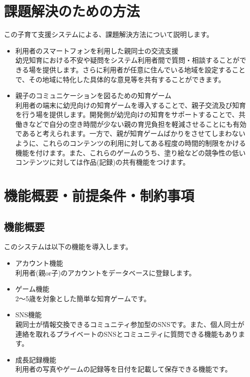\documentclass[a4j]{jarticle}
\begin{document}
\section{課題解決のための方法}
この子育て支援システムによる、課題解決方法について説明します。
\begin{itemize}
  \item 利用者のスマートフォンを利用した親同士の交流支援 ~\\
    幼児知育における不安や疑問をシステム利用者間で質問・相談することができる場を提供します。さらに利用者が任意に住んでいる地域を設定することで、その地域に特化した具体的な意見等を共有することができます。
  \item 親子のコミュニケーションを図るための知育ゲーム ~\\
    利用者の端末に幼児向けの知育ゲームを導入することで、親子交流及び知育を行う場を提供します。開発側が幼児向けの知育をサポートすることで、共働きなどで自分の空き時間が少ない親の育児負担を軽減させることにも有効であると考えられます。一方で、親が知育ゲームばかりをさせてしまわないように、これらのコンテンツの利用に対してある程度の時間的制限をかける機能を付けます。また、これらのゲームのうち、塗り絵などの競争性の低いコンテンツに対しては作品(記録)の共有機能をつけます。
\end{itemize}

\section{機能概要・前提条件・制約事項}

\subsection{機能概要}
このシステムは以下の機能を導入します。
\begin{itemize}
\item アカウント機能 ~\\
利用者(親or子)のアカウントをデータベースに登録します。
\item ゲーム機能 ~\\
2～5歳を対象とした簡単な知育ゲームです。
\item SNS機能 ~\\
親同士が情報交換できるコミュニティ参加型のSNSです。また、個人同士が連絡を取れるプライベートのSNSとコミュニティに質問できる機能もあります。
\item 成長記録機能 ~\\
利用者の写真やゲームの記録等を日付を記載して保存できる機能です。
\end{itemize}
\end{document}
